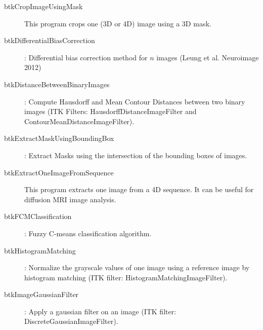 \begin{description}
\item[btkCropImageUsingMask] This program crops one (3D or 4D) image using a 3D mask.
\item[btkDifferentialBiasCorrection]: Differential bias correction method for $n$ images (Leung et al. Neuroimage 2012) 

\item[btkDistanceBetweenBinaryImages]: Compute Hausdorff and Mean Contour Distances between two binary images (ITK Filters: HausdorffDistanceImageFilter and ContourMeanDistanceImageFilter).
\item[btkExtractMaskUsingBoundingBox]: Extract Masks using the intersection of the bounding boxes of images.
\item[btkExtractOneImageFromSequence] This program extracts one image from a 4D sequence. It can be useful for diffusion MRI image analysis. 
\item[btkFCMClassification]: Fuzzy C-means classification algorithm.
\item[btkHistogramMatching]: Normalize the grayscale values of one image using a reference image by histogram matching (ITK filter: HistogramMatchingImageFilter).%
\item[btkImageGaussianFilter]: Apply a gaussian filter on an image (ITK filter: DiscreteGaussianImageFilter).

\end{description}
